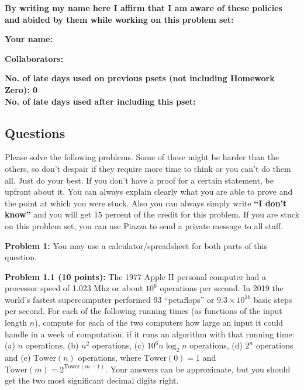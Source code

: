 \documentclass[11pt]{article}
\begin{document}
	\textbf{By writing my name here I affirm that I am aware of these policies
		and abided by them while working on this problem set:}

	\textbf{Your name:} %

	\textbf{Collaborators:} %

	\textbf{No. of late days used on previous psets (not including Homework Zero): 0
}\\
	\textbf{No. of late days used after including this pset: %
}


	\newpage


	\subsection*{Questions}\label{questions}

{	\color{red}
Please solve the following problems. Some of these might be harder than
the others, so don't despair if they require more time to think or you
can't do them all. Just do your best. If you don't have a proof
for a certain statement, be upfront about it. You can always explain
clearly what you are able to prove and the point at which you were
stuck. Also you can always simply write
\textbf{``I don't know''} and you will get 15 percent of the credit for
this problem. If you are stuck on this problem set, you can use Piazza to
send a private message to all staff.

}

\newcommand{\Tower}{\mathrm{Tower}}
\textbf{Problem 1:} You may use a calculator/spreadsheet for both parts of this question.

\textbf{Problem 1.1 (10 points):} The 1977 Apple II personal computer had a processor
speed of 1.023 Mhz or about $10^6$ operations per second. In 2019 the world’s fastest supercomputer performed 93
“petaflops”  or $9.3 \times 10^{16}$
basic steps per second. For each of the following running times
(as functions of the input length $n$), compute for each of the two computers how
large an input it could handle in a week of computation, if it runs
an algorithm with that running time: (a) $n$ operations, (b) $n^2$ operations, (c) $10^6 n \log_2 n$ operations, (d) $2^n$ operations and (e) $\Tower(n)$ operations, where $\Tower(0) = 1$ and $\Tower(m) = 2^{\Tower(m-1)}$. Your answers can be approximate, but you should get the two most significant decimal digits right.
\end{document}
